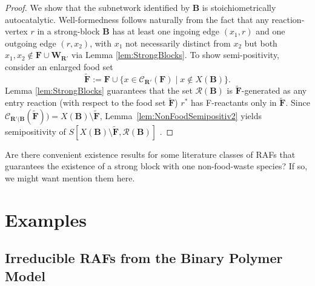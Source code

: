 \documentclass[pdflatex]{sn-jnl}
\theoremstyle{thmstyleone}%
\theoremstyle{examplesty}%
\theoremstyle{thmstylethree}%
\newcommand{\food}{\ensuremath{\mathbf{F}}}
\newcommand{\closure}[2]{\mathscr{C}_{#1}(#2)}
\newcommand{\RAF}[0]{\mathbf{R}'}
\newcommand{\block}[0]{\mathbf{B}}
\newcommand{\TODO}[1]{\begingroup\color{red}#1\endgroup}
\newcommand{\PFS}[1]{\begingroup\color{cyan}#1\endgroup}
\newcommand{\NV}[1]{\begingroup\color{teal}#1\endgroup}
\begin{document}
\begin{proof}
  We show that the subnetwork identified by $\block$ is stoichiometrically
  autocatalytic.
  Well-formedness follows naturally from the fact that any reaction-vertex
  $r$ in a strong-block $\block$ has at least one ingoing edge $(x_1,r)$
  and one outgoing edge $(r,x_2)$, with $x_1$ not necessarily distinct from
  $x_2$ but both $x_1,x_2\not\in \food \cup\mathbf{W}_{\RAF}$ via Lemma
  \ref{lem:StrongBlocks}.
  To show semi-positivity, consider an enlarged food
  set \begin{equation}\tilde{\food}:=\food\cup\{x\in
    \closure{\RAF}{\food}\;|\; x\not\in X(\block)\}.
  \end{equation}
  Lemma \ref{lem:StrongBlocks} guarantees that the set
  $\mathcal{R}(\block)$ is $\tilde{\food}$-generated as any entry reaction
  (with respect to the food set $\tilde{\food}$) $r^*$ has F-reactants only
  in $\tilde{\food}$. Since
  $\closure{\mathbf{R}'(\block}{\tilde{\food}})=X(\block)\setminus
  \tilde{\food}$, Lemma~\ref{lem:NonFoodSemipositiv2} yields semipositivity
  of $S[X(\block)\setminus \tilde{\food},\mathcal{R}(\block)]$ .
\end{proof}

\TODO{Are there convenient existence results for some literature classes of
  RAFs that guarantees the existence of a strong block with one
  non-food-waste species? If so, we might want mention them here.}

\section{Examples}
\label{sec:examples}


\subsection{Irreducible RAFs from the Binary Polymer Model}
\end{document}
